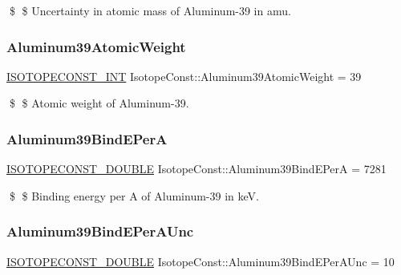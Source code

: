 \$ \$ Uncertainty in atomic mass of Aluminum-\/39 in amu. \mbox{\label{group___isotope_const-_aluminum-_al39_ga518368ffeaf33992b32890224df1f5fa}} 
\subsubsection{\texorpdfstring{Aluminum39\+Atomic\+Weight}{Aluminum39AtomicWeight}}
{\footnotesize\ttfamily \mbox{\hyperlink{group___isotope_const-_macros_ga5f18360b3e99483a35c32d789e62621c}{I\+S\+O\+T\+O\+P\+E\+C\+O\+N\+S\+T\+\_\+\+I\+NT}} Isotope\+Const\+::\+Aluminum39\+Atomic\+Weight = 39}

\$ \$ Atomic weight of Aluminum-\/39. \mbox{\label{group___isotope_const-_aluminum-_al39_ga1eeefaf63017a75e53fb1ec7fa1178a1}} 
\subsubsection{\texorpdfstring{Aluminum39\+Bind\+E\+PerA}{Aluminum39BindEPerA}}
{\footnotesize\ttfamily \mbox{\hyperlink{group___isotope_const-_macros_ga8f45a7272ce02c0b4c65c44636ed719a}{I\+S\+O\+T\+O\+P\+E\+C\+O\+N\+S\+T\+\_\+\+D\+O\+U\+B\+LE}} Isotope\+Const\+::\+Aluminum39\+Bind\+E\+PerA = 7281}

\$ \$ Binding energy per A of Aluminum-\/39 in keV. \mbox{\label{group___isotope_const-_aluminum-_al39_ga0500649b27b2ad25ed06da5a5f39f48d}} 
\subsubsection{\texorpdfstring{Aluminum39\+Bind\+E\+Per\+A\+Unc}{Aluminum39BindEPerAUnc}}
{\footnotesize\ttfamily \mbox{\hyperlink{group___isotope_const-_macros_ga8f45a7272ce02c0b4c65c44636ed719a}{I\+S\+O\+T\+O\+P\+E\+C\+O\+N\+S\+T\+\_\+\+D\+O\+U\+B\+LE}} Isotope\+Const\+::\+Aluminum39\+Bind\+E\+Per\+A\+Unc = 10}

